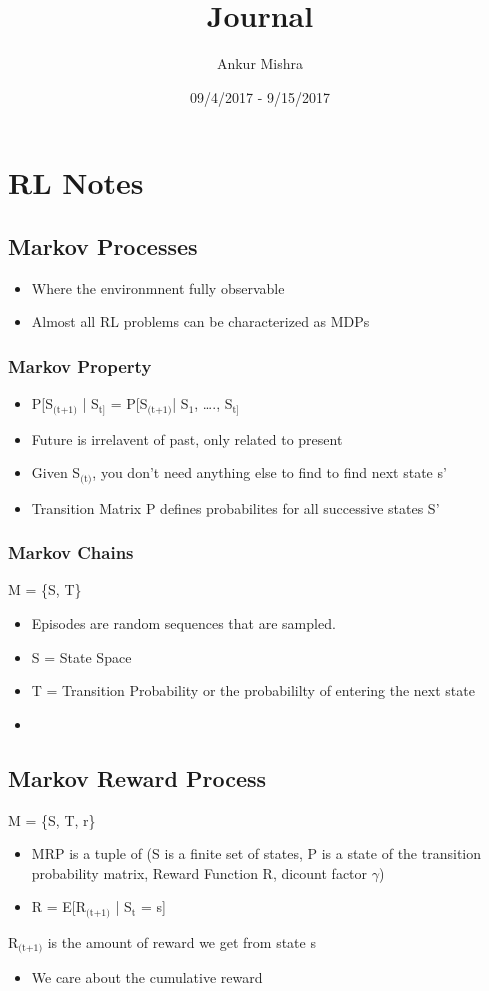 \documentclass[11pt]{article}
\author{Ankur Mishra}
\date{09/4/2017 - 9/15/2017}
\title{Journal}
\begin{document}
\maketitle
\tableofcontents

\section{RL Notes}
\label{sec-1}
\subsection{Markov Processes}
\label{sec-1-1}
\begin{itemize}
\item Where the environmnent fully observable
\item Almost all RL problems can be characterized as MDPs
\end{itemize}
\subsubsection{Markov Property}
\label{sec-1-1-1}
\begin{itemize}
\item P[S$_{\text{(t+1)}}$ | S$_{\text{t]}}$ = P[S$_{\text{(t+1)}}$| S$_{\text{1}}$, \ldots{}., S$_{\text{t]}}$
\item Future is irrelavent of past, only related to present
\item Given S$_{\text{(t)}}$, you don't need anything else to find to find next state s'
\item Transition Matrix P defines probabilites for all successive states S'
\end{itemize}
\subsubsection{Markov Chains}
\label{sec-1-1-2}
M = \{S, T\}
\begin{itemize}
\item Episodes are random sequences that are sampled.
\item S = State Space
\item T = Transition Probability or the probabililty of entering the next state
\item 
\end{itemize}
\subsection{Markov Reward Process}
\label{sec-1-2}
M = \{S, T, r\}
\begin{itemize}
\item MRP is a tuple of (S is a finite set of states, P is a state of the transition probability matrix, Reward Function R, dicount factor $\gamma$)
\item R = E[R$_{\text{(t+1)}}$ | S$_{\text{t}}$ = s]
\end{itemize}
R$_{\text{(t+1)}}$ is the amount of reward we get from state s
\begin{itemize}
\item We care about the cumulative reward
\end{itemize}
\end{document}
